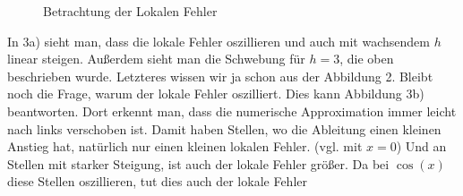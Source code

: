 \documentclass{article}
\begin{document}
	\begin{figure}[H]
		\centering
		\quad
		\caption{Betrachtung der Lokalen Fehler}
	\end{figure}
	In 3a) sieht man, dass die lokale Fehler oszillieren und auch mit wachsendem $h$ linear steigen. Außerdem sieht man die Schwebung für $h=3$, die oben beschrieben wurde. Letzteres wissen wir ja schon aus der Abbildung 2. Bleibt noch die Frage, warum der lokale Fehler oszilliert. Dies kann Abbildung 3b) beantworten. Dort erkennt man, dass die numerische Approximation immer leicht nach links verschoben ist. Damit haben Stellen, wo die Ableitung einen kleinen Anstieg hat, natürlich nur einen kleinen lokalen Fehler. (vgl. mit $x=0$) Und an Stellen mit starker Steigung, ist auch der lokale Fehler größer. Da bei $\cos(x)$ diese Stellen oszillieren, tut dies auch der lokale Fehler
	
	
\end{document}
